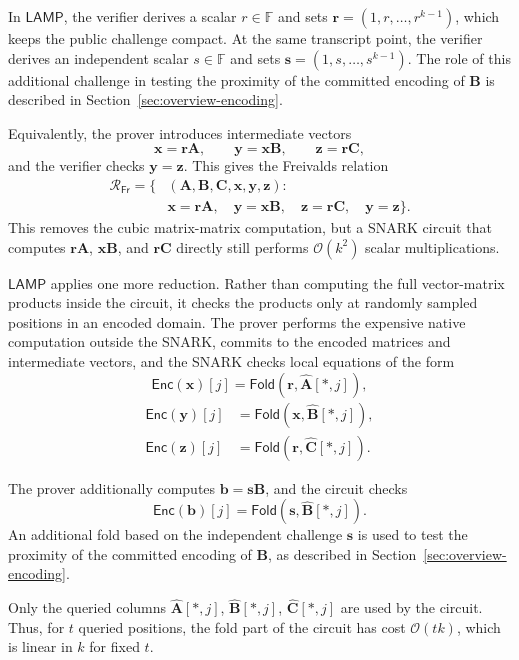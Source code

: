 \documentclass[conference,compsoc]{IEEEtran}
\newif\ifshowrevisions
\newenvironment{revblock}[1][]
  {%
    \ifshowrevisions
      \begin{tcolorbox}[
        breakable,
        colback=revisionyellow,
        colframe=revisionyellow,
        boxrule=0pt,
        arc=0pt,
        left=2pt,
        right=2pt,
        top=2pt,
        bottom=2pt,
        before skip=2pt,
        after skip=2pt,
        #1
      ]
    \fi
  }
  {%
    \ifshowrevisions
      \end{tcolorbox}
    \fi
  }
\newcommand{\mat}{\mathbf}          %
\newcommand{\vect}{\mathbf}         %
\renewcommand{\enc}{\mathsf{Enc}}   %
\newcommand{\relation}{{\mathcal{R}}}
\newcommand{\fold}{\textsf{Fold}}
\newcommand{\protocol}{\textsf{LAMP}}   %
\theoremstyle{plain}
\theoremstyle{definition}
\theoremstyle{remark}
\begin{document}
\begin{revblock}
  In \(\protocol\), the verifier derives a scalar \(r\in\mathbb{F}\) and
sets $\vect{r}=(1,r,\ldots,r^{k-1})$,
which keeps the public challenge compact.
  At the same transcript point, the verifier derives an independent scalar
\(s\in\mathbb{F}\) and sets $\vect{s}=(1,s,\ldots,s^{k-1})$. 
The role of this additional challenge in testing the proximity of the
committed encoding of $\mat{B}$ is described in Section~\ref{sec:overview-encoding}.
\end{revblock}
Equivalently, the prover introduces intermediate vectors
\[
  \vect{x}=\vect{r}\mat{A},
  \qquad
  \vect{y}=\vect{x}\mat{B},
  \qquad
  \vect{z}=\vect{r}\mat{C},
\]
and the verifier checks \(\vect{y}=\vect{z}\).  This gives the Freivalds
relation
\[
\begin{aligned}
\relation_{\mathsf{Fr}}
=
\Big\{
&(\mat{A},\mat{B},\mat{C},\vect{x},\vect{y},\vect{z}) :
\\
&\vect{x}=\vect{r}\mat{A},\quad
  \vect{y}=\vect{x}\mat{B},\quad
  \vect{z}=\vect{r}\mat{C},\quad
  \vect{y}=\vect{z}
\Big\}.
\end{aligned}
\]
This removes the cubic matrix-matrix computation, but a SNARK circuit that
computes \(\vect{r}\mat{A}\), \(\vect{x}\mat{B}\), and \(\vect{r}\mat{C}\)
directly still performs \(\mathcal{O}(k^2)\) scalar multiplications.

\(\protocol\) applies one more reduction.  Rather than computing the full
vector-matrix products inside the circuit, it checks the products only at
randomly sampled positions in an encoded domain.  The prover performs the
expensive native computation outside the SNARK, commits to the encoded
matrices and intermediate vectors, and the SNARK checks local equations of the
form
\[
  \enc(\vect{x})[j]
  =
  \fold(\vect{r},\widehat{\mat{A}}[*,j]),
\]
\[
\begin{aligned}
  \enc(\vect{y})[j]
  &=
  \fold(\vect{x},\widehat{\mat{B}}[*,j]),\\
  \enc(\vect{z})[j]
  &=
  \fold(\vect{r},\widehat{\mat{C}}[*,j]).
\end{aligned}
\]
\begin{revblock}
  The prover additionally computes $\vect{b} = \vect{s}\mat{B}$, and the circuit checks
  \[
    \enc(\vect{b})[j] = \fold(\vect{s},\widehat{\mat{B}}[*,j]).
  \]
  An additional fold based on the independent challenge $\vect{s}$ is used
to test the proximity of the committed encoding of $\mat{B}$, as described
in Section~\ref{sec:overview-encoding}.
\end{revblock}
Only the queried columns
\(\widehat{\mat{A}}[*,j]\), \(\widehat{\mat{B}}[*,j]\),
\(\widehat{\mat{C}}[*,j]\) are used by the circuit.  Thus, for \(t\) queried
positions, the fold part of the circuit has cost \(\mathcal{O}(tk)\), which is
linear in \(k\) for fixed \(t\).
\end{document}
